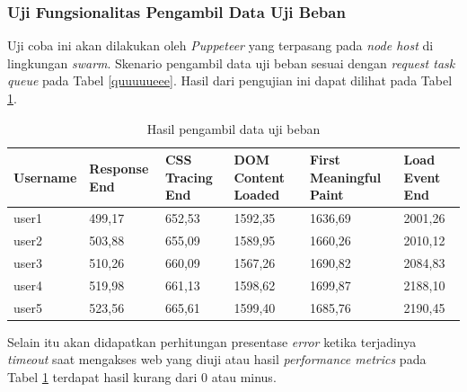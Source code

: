 			\subsubsection{Uji Fungsionalitas Pengambil Data Uji Beban}
				Uji coba ini akan dilakukan oleh \textit{Puppeteer} yang terpasang pada \textit{node host} di lingkungan \textit{swarm}. Skenario pengambil data uji beban sesuai dengan \textit{request task queue} pada Tabel \ref{quuuuueee}. Hasil dari pengujian ini dapat dilihat pada Tabel \ref{dataujibeban}.
				\begin{longtable}{|p{0.15\textwidth}|p{}|p{}|p{}|p{}|p{}|}
					\caption{Hasil pengambil data uji beban} \label{dataujibeban} \\
					\hline
					\textbf{Username} & \textbf{Response End} & \textbf{CSS Tracing End} & \textbf{DOM Content Loaded} & \textbf{First Meaningful Paint} & \textbf{Load Event End} \\ \hline
					\endhead
					\endfoot
					\endlastfoot
					user1 & 499,17 & 652,53 & 1592,35 & 1636,69 & 2001,26 \\ \hline
					user2 & 503,88 & 655,09 & 1589,95 & 1660,26 & 2010,12 \\ \hline
					user3 & 510,26 & 660,09 & 1567,26 & 1690,82 & 2084,83 \\ \hline
					user4 & 519,98 & 661,13 & 1598,62 & 1699,87 & 2188,10 \\ \hline
					user5 & 523,56 & 665,61 & 1599,40 & 1685,76 & 2190,45 \\ \hline
				\end{longtable}
			
				Selain itu akan didapatkan perhitungan presentase \textit{error} ketika terjadinya \textit{timeout} saat mengakses web yang diuji atau hasil \textit{performance metrics} pada Tabel \ref{dataujibeban} terdapat hasil kurang dari 0 atau minus.
				

